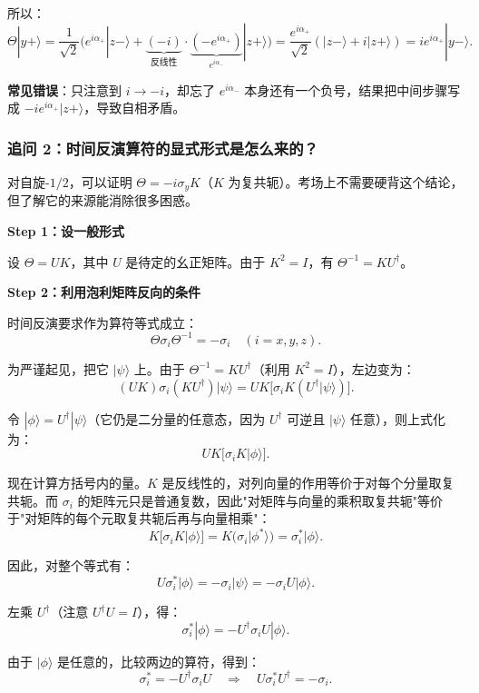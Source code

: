 所以：
\[
\Theta|y+\rangle = \frac{1}{\sqrt{2}}\bigl(e^{i\alpha_+}|z-\rangle + \underbrace{(-i)}_{\text{反线性}} \cdot \underbrace{(-e^{i\alpha_+})}_{e^{i\alpha_-}} |z+\rangle\bigr) = \frac{e^{i\alpha_+}}{\sqrt{2}}(|z-\rangle + i|z+\rangle) = i e^{i\alpha_+}|y-\rangle.
\]

\textbf{常见错误}：只注意到 $i \to -i$，却忘了 $e^{i\alpha_-}$ 本身还有一个负号，结果把中间步骤写成 $-i e^{i\alpha_+}|z+\rangle$，导致自相矛盾。

\subsubsection*{追问 2：时间反演算符的显式形式是怎么来的？}

对自旋-$1/2$，可以证明 $\Theta = -i\sigma_y K$（$K$ 为复共轭）。考场上不需要硬背这个结论，但了解它的来源能消除很多困惑。

\textbf{Step 1：设一般形式}

设 $\Theta = UK$，其中 $U$ 是待定的幺正矩阵。由于 $K^2 = I$，有 $\Theta^{-1} = KU^\dagger$。

\textbf{Step 2：利用泡利矩阵反向的条件}

时间反演要求作为算符等式成立：
\[
\Theta \sigma_i \Theta^{-1} = -\sigma_i \quad (i = x,y,z).
\]

为严谨起见，把它 $|\psi\rangle$ 上。由于 $\Theta^{-1} = KU^\dagger$（利用 $K^2 = I$），左边变为：
\[
(UK) \sigma_i (KU^\dagger) |\psi\rangle = U K \bigl[ \sigma_i K (U^\dagger |\psi\rangle) \bigr].
\]

令 $|\phi\rangle = U^\dagger |\psi\rangle$（它仍是二分量的任意态，因为 $U^\dagger$ 可逆且 $|\psi\rangle$ 任意），则上式化为：
\[
U K \bigl[ \sigma_i K |\phi\rangle \bigr].
\]

现在计算方括号内的量。$K$ 是反线性的，对列向量的作用等价于对每个分量取复共轭。而 $\sigma_i$ 的矩阵元只是普通复数，因此"对矩阵与向量的乘积取复共轭"等价于"对矩阵的每个元取复共轭后再与向量相乘"：
\[
K \bigl[ \sigma_i K |\phi\rangle \bigr] = K \bigl( \sigma_i |\phi^*\rangle \bigr) = \sigma_i^* |\phi\rangle.
\]

因此，对整个等式有：
\[
U \sigma_i^* |\phi\rangle = -\sigma_i |\psi\rangle = -\sigma_i U |\phi\rangle.
\]

左乘 $U^\dagger$（注意 $U^\dagger U = I$），得：
\[
\sigma_i^* |\phi\rangle = -U^\dagger \sigma_i U |\phi\rangle.
\]

由于 $|\phi\rangle$ 是任意的，比较两边的算符，得到：
\[
\sigma_i^* = -U^\dagger \sigma_i U \quad\Longrightarrow\quad U \sigma_i^* U^\dagger = -\sigma_i.
\]

